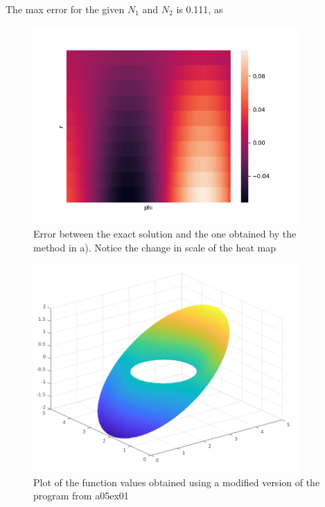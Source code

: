 The max error for the given $N_1$ and $N_2$ is 0.111, as 

\begin{figure}[H]
	\centering
	\includegraphics[width=0.9\textwidth]{Documentation/Figures/a06ex02c_error.png} 
	\caption{Error between the exact solution and the one obtained by the method in a). Notice the change in scale of the heat map}
	\label{fig:a05ex02b}
\end{figure}

\begin{figure}[H]
	\centering
	\includegraphics[width=0.9\textwidth]{Documentation/Figures/a06ex02d_uh.png} 
	\caption{Plot of the function values obtained using a modified version of the program from a05ex01}
	\label{fig:a05ex02b}
\end{figure}

